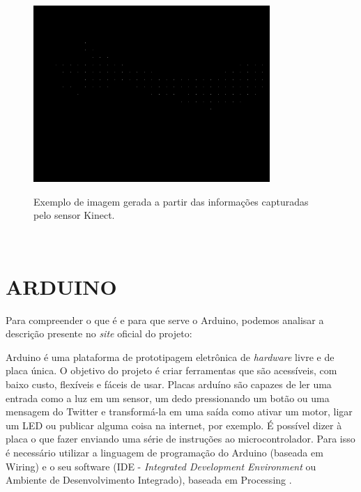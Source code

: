 \begin{figure}[H]
    \centering
    \caption{Exemplo de imagem gerada a partir  das informações capturadas  pelo sensor Kinect.}
	\vspace*{0,2cm}
    \includegraphics[width=0.8\textwidth]{./04-figuras/kinect_exemplo}
    \label{fig:kinect_exemplo}
\end{figure}
\vspace*{-0,9cm}
{\raggedright {}}\\


\section{ARDUINO}

Para compreender o que é e para que serve o Arduino, podemos analisar a descrição presente no \textit{site} oficial do projeto:

\begin{citacao}
Arduino é uma plataforma de prototipagem eletrônica de \textit{hardware} livre e de placa única. O objetivo do projeto é criar ferramentas que são acessíveis, com baixo custo, flexíveis e fáceis de usar. Placas arduíno são capazes de ler uma entrada como a luz em um sensor, um dedo pressionando um botão ou uma mensagem do Twitter e transformá-la em uma saída como ativar um motor, ligar um LED ou publicar alguma coisa na internet, por exemplo. É possível dizer à placa o que fazer enviando uma série de instruções ao microcontrolador. Para isso é necessário utilizar a linguagem de programação do Arduino (baseada em Wiring) e o seu software (IDE - \textit{Integrated Development Environment} ou Ambiente de Desenvolvimento Integrado), baseada em Processing \cite{arduino}. 
\end{citacao}

